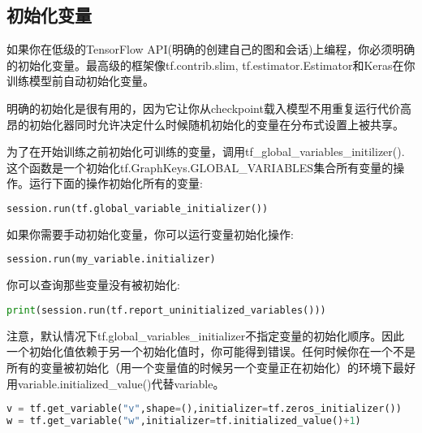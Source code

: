 \subsection{初始化变量}
{\color{red}{在使用变量之前，你必须对变量进行初始化。}}如果你在低级的TensorFlow API(明确的创建自己的图和会话)上编程，你必须明确的初始化变量。最高级的框架像tf.contrib.slim,\newline
tf.estimator.Estimator和Keras在你训练模型前自动初始化变量。

明确的初始化是很有用的，因为它让你从checkpoint载入模型不用重复运行代价高昂的初始化器同时允许决定什么时候随机初始化的变量在分布式设置上被共享。

为了在开始训练之前初始化可训练的变量，调用tf\_global\_variables\_initilizer().这个函数是一个初始化tf.GraphKeys.GLOBAL\_VARIABLES集合所有变量的操作。运行下面的操作初始化所有的变量:
\begin{lstlisting}[language=Python]
session.run(tf.global_variable_initializer())
\end{lstlisting}
如果你需要手动初始化变量，你可以运行变量初始化操作:
\begin{lstlisting}[language=Python]
session.run(my_variable.initializer)
\end{lstlisting}
你可以查询那些变量没有被初始化:
\begin{lstlisting}[language=Python]
print(session.run(tf.report_uninitialized_variables()))
\end{lstlisting}
注意，默认情况下tf.global\_variables\_initializer不指定变量的初始化顺序。因此一个初始化值依赖于另一个初始化值时，你可能得到错误。任何时候你在一个不是所有的变量被初始化（用一个变量值的时候另一个变量正在初始化）的环境下最好用variable.initialized\_value()代替variable。
\begin{lstlisting}[language=Python]
v = tf.get_variable("v",shape=(),initializer=tf.zeros_initializer())
w = tf.get_variable("w",initializer=tf.initialized_value()+1)
\end{lstlisting}
